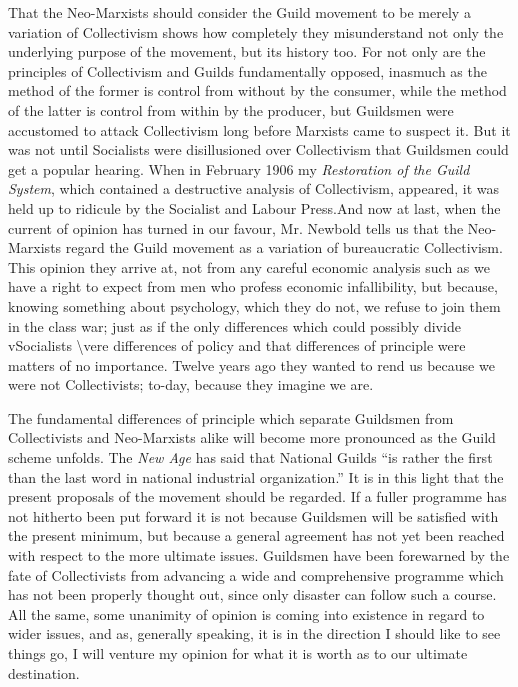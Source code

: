 \documentclass{book}
\begin{document}
That the Neo-Marxists should consider the Guild movement to be merely a variation of Collectivism shows how completely they misunderstand not only the underlying purpose of the movement, but its history too. For not only are the principles of Collectivism and Guilds fundamentally opposed, inasmuch as the method of the former is control from without by the consumer, while the method of the latter is control from within by the producer, but Guildsmen were accustomed to attack Collectivism long before Marxists came to suspect it. But it was not until Socialists were disillusioned over Collectivism that Guildsmen could get a popular hearing. When in February 1906 my \emph{Restoration of the Guild System}, which contained a destructive analysis of Collectivism, appeared, it was held up to ridicule by the Socialist and Labour Press.\footnotemark[1] And now at last, when the current of opinion has turned in our favour, Mr. Newbold tells us that the Neo-Marxists regard the Guild movement as a variation of bureaucratic Collectivism. This opinion they arrive at, not from any careful economic analysis such as we have a right to expect from men who profess economic infallibility, but because, knowing something about psychology, which they do not, we refuse to join them in the class war; just as if the only differences which could possibly divide vSocialists \textbackslash{}vere differences of policy and that differences of principle were matters of no importance. Twelve years ago they wanted to rend us because we were not Collectivists; to-day, because they imagine we are.

The fundamental differences of principle which separate Guildsmen from Collectivists and Neo-Marxists alike will become more pronounced as the Guild scheme unfolds. The \emph{New Age} has said that National Guilds “is rather the first than the last word in national industrial organization.” It is in this light that the present proposals of the movement should be regarded. If a fuller programme has not hitherto been put forward it is not because Guildsmen will be satisfied with the present minimum, but because a general agreement has not yet been reached with respect to the more ultimate issues. Guildsmen have been forewarned by the fate of Collectivists from advancing a wide and comprehensive programme which has not been properly thought out, since only disaster can follow such a course. All the same, some unanimity of opinion is coming into existence in regard to wider issues, and as, generally speaking, it is in the direction I should like to see things go, I will venture my opinion for what it is worth as to our ultimate destination.
\end{document}
